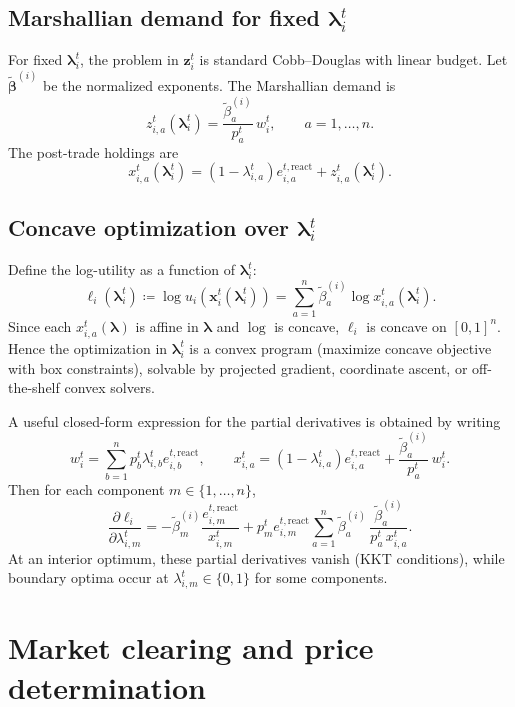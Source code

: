 \documentclass[11pt]{article}
\begin{document}
\subsection{Marshallian demand for fixed \texorpdfstring{\(\bm{\lambda}_i^t\)}{lambda}}

For fixed \(\bm{\lambda}_i^t\), the problem in \(\bm{z}_i^t\) is standard Cobb--Douglas with linear budget.
Let \(\tilde{\bm{\beta}}^{(i)}\) be the normalized exponents. The Marshallian demand is
\[
z_{i,a}^t(\bm{\lambda}_i^t)
= \frac{\tilde{\beta}_a^{(i)}}{p_a^t}\,w_i^t,
\qquad a=1,\dots,n.
\]
The post-trade holdings are
\[
x_{i,a}^t(\bm{\lambda}_i^t)
= (1-\lambda_{i,a}^t)e_{i,a}^{t,\mathrm{react}} + z_{i,a}^t(\bm{\lambda}_i^t).
\]

\subsection{Concave optimization over \texorpdfstring{\(\bm{\lambda}_i^t\)}{lambda}}

Define the log-utility as a function of \(\bm{\lambda}_i^t\):
\[
\ell_i(\bm{\lambda}_i^t)
\coloneqq \log u_i(\bm{x}_i^t(\bm{\lambda}_i^t))
= \sum_{a=1}^n \tilde{\beta}_a^{(i)}\log x_{i,a}^t(\bm{\lambda}_i^t).
\]
Since each \(x_{i,a}^t(\bm{\lambda})\) is affine in \(\bm{\lambda}\) and \(\log\) is concave, \(\ell_i\) is concave
on \([0,1]^n\). Hence the optimization in \(\bm{\lambda}_i^t\) is a convex program (maximize concave objective with
box constraints), solvable by projected gradient, coordinate ascent, or off-the-shelf convex solvers.

A useful closed-form expression for the partial derivatives is obtained by writing
\[
w_i^t = \sum_{b=1}^n p_b^t \lambda_{i,b}^t e_{i,b}^{t,\mathrm{react}},
\qquad
x_{i,a}^t = (1-\lambda_{i,a}^t)e_{i,a}^{t,\mathrm{react}} + \frac{\tilde{\beta}_a^{(i)}}{p_a^t}\,w_i^t.
\]
Then for each component \(m \in \{1,\dots,n\}\),
\[
\frac{\partial \ell_i}{\partial \lambda_{i,m}^t}
=
-\tilde{\beta}_m^{(i)}\frac{e_{i,m}^{t,\mathrm{react}}}{x_{i,m}^t}
+
p_m^t e_{i,m}^{t,\mathrm{react}}
\sum_{a=1}^n
\tilde{\beta}_a^{(i)}\,
\frac{\tilde{\beta}_a^{(i)}}{p_a^t\,x_{i,a}^t}.
\]
At an interior optimum, these partial derivatives vanish (KKT conditions), while boundary optima occur at
\(\lambda_{i,m}^t \in \{0,1\}\) for some components.

\section{Market clearing and price determination}
\end{document}
